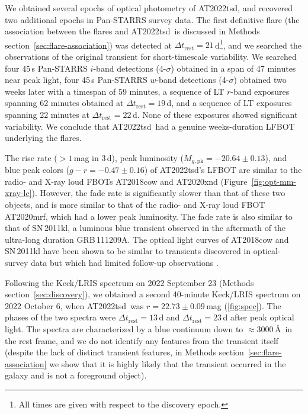 \documentclass{nature_plusfigure}
\newcommand{\at}{AT2022tsd}
\begin{document}
\begin{methods}
We obtained several epochs of optical photometry of \at, and recovered two additional epochs in Pan-STARRS survey data.
The first definitive flare (the association between the flares and \at\ is discussed in Methods section~\ref{sec:flare-association}) was detected at $\Delta t_\mathrm{rest}=21$\,d\footnote{All times are given with respect to the discovery epoch.}, and we searched the observations of the original transient for short-timescale variability.
We searched four 45\,s Pan-STARRS $i$-band detections (4-$\sigma$) obtained in a span of 47 minutes near peak light,
four 45\,s Pan-STARRS $w$-band detections (4-$\sigma$) obtained two weeks later with a timespan of 59 minutes,
a sequence of LT $r$-band exposures spanning 62 minutes obtained at $\Delta t_\mathrm{rest}=19\,$d,
and a sequence of LT exposures spanning 22 minutes at $\Delta t_\mathrm{rest}=22$\,d.
None of these exposures showed significant variability.
We conclude that \at\ had a genuine weeks-duration LFBOT underlying the flares.

The rise rate ($>1\,$mag in 3\,d), peak luminosity ($M_{g,\mathrm{pk}}=-20.64\pm0.13$), and blue peak colors ($g-r=-0.47\pm0.16$) of \at's LFBOT are similar to the radio- and X-ray loud FBOTs AT2018cow and AT2020xnd (Figure~\ref{fig:opt-mm-xray-lc}). However, the fade rate is significantly slower than that of these two objects, and is more similar to that of the radio- and X-ray loud FBOT AT2020mrf\cite{Yao2022}, which had a lower peak luminosity. The fade rate is also similar to that of SN\,2011kl, a luminous blue transient observed in the aftermath of the ultra-long duration GRB\,111209A\cite{Greiner2015}.
The optical light curves of AT2018cow and SN\,2011kl have been shown to be similar to transients discovered in optical-survey data but which had limited follow-up observations \cite{Arcavi2016,Pursiainen2018,Drout2014}.

Following the Keck/LRIS spectrum on 2022 September 23 (Methods section~\ref{sec:discovery}), we obtained a second 40-minute Keck/LRIS spectrum on 2022 October 6, when \at\ was $r=22.73\pm0.09\,$mag (\ref{fig:spec}). 
The phases of the two spectra were $\Delta t_\mathrm{rest}=13\,$d and $\Delta t_\mathrm{rest}=23$\,d after peak optical light.
The spectra are characterized by a blue continuum down to $\approx3000\,$\AA\ in the rest frame, and we do not identify any features from the transient itself (despite the lack of distinct transient features, in Methods section~\ref{sec:flare-association} we show that it is highly likely that the transient occurred in the galaxy and is not a foreground object). 


\end{methods}
\end{document}
